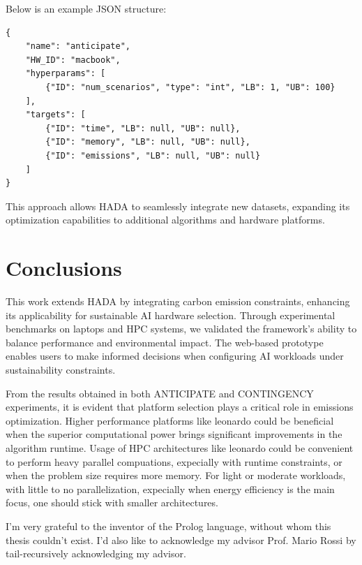 \documentclass[a4paper,singleside,12pt]{report} %
\begin{document}
Below is an example JSON structure:

\begin{verbatim}
{
    "name": "anticipate",
    "HW_ID": "macbook",
    "hyperparams": [
        {"ID": "num_scenarios", "type": "int", "LB": 1, "UB": 100}
    ],
    "targets": [
        {"ID": "time", "LB": null, "UB": null},
        {"ID": "memory", "LB": null, "UB": null},
        {"ID": "emissions", "LB": null, "UB": null}
    ]
}
\end{verbatim}

This approach allows HADA to seamlessly integrate new datasets, expanding its optimization capabilities to additional algorithms and hardware platforms.

\chapter{Conclusions}

This work extends HADA by integrating carbon emission constraints, enhancing its applicability 
for sustainable AI hardware selection. Through experimental benchmarks on laptops and HPC systems, 
we validated the framework’s ability to balance performance and environmental impact. The web-based prototype 
enables users to make informed decisions when configuring AI workloads under sustainability constraints.

From the results obtained in both ANTICIPATE and CONTINGENCY experiments, it is evident that platform selection plays a critical role in emissions optimization. Higher performance platforms like
leonardo could be beneficial when the superior computational power brings significant improvements in the algorithm runtime. Usage of HPC architectures like leonardo could be convenient to 
perform heavy parallel compuations, expecially with runtime constraints, or when the problem size requires more memory. For light or moderate workloads, with little to no parallelization, expecially
when energy efficiency is the main focus, one should stick with smaller architectures.

\appendix

\printbibliography[heading=bibintoc] %

\acknowledgements
I'm very grateful to the inventor of the Prolog language, without whom this thesis couldn't exist. I'd also like 
to acknowledge my advisor Prof. Mario Rossi by tail-recursively acknowledging my advisor.
	
\end{document}

